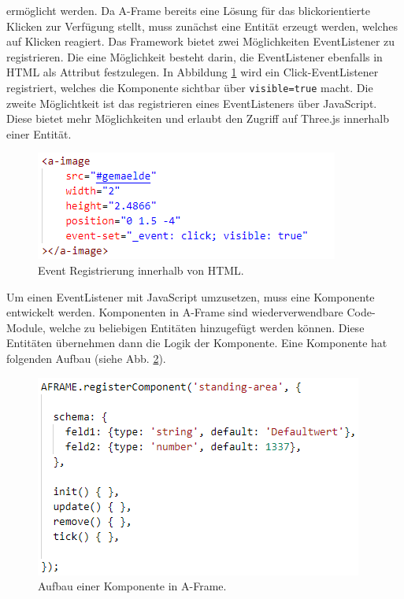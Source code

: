\documentclass[a4paper,12pt,oneside]{article}
\begin{document}
        ermöglicht werden. Da A-Frame bereits eine Lösung für das 
        blickorientierte Klicken zur Verfügung stellt, muss zunächst eine
        Entität erzeugt werden, welches auf Klicken reagiert. Das Framework
        bietet zwei Möglichkeiten EventListener zu registrieren. Die eine
        Möglichkeit besteht darin, die EventListener ebenfalls in HTML
        als Attribut festzulegen. In Abbildung \ref{fig:a-image2} wird
        ein Click-EventListener registriert, welches die Komponente 
        sichtbar über \texttt{visible=true} macht. Die zweite Möglichtkeit
        ist das registrieren eines EventListeners über JavaScript. Diese
        bietet mehr Möglichkeiten und erlaubt den Zugriff auf Three.js
        innerhalb einer Entität.
        \begin{figure}[h]
          \centering
          \includegraphics{img/coding/a-image2.png}
          \caption{Event Registrierung innerhalb von HTML.}
          \label{fig:a-image2}
        \end{figure}
        Um einen EventListener mit JavaScript umzusetzen, muss eine Komponente
        entwickelt werden. Komponenten in A-Frame sind wiederverwendbare
        Code-Module, welche zu beliebigen Entitäten hinzugefügt werden
        können. Diese Entitäten übernehmen dann die Logik der Komponente.
        Eine Komponente hat folgenden Aufbau (siehe Abb. \ref{fig:komponente1}).
        \begin{figure}[h]
          \centering
          \includegraphics{img/coding/komponente1.png}
          \caption{Aufbau einer Komponente in A-Frame.}
          \label{fig:komponente1}
        \end{figure}
\end{document}
